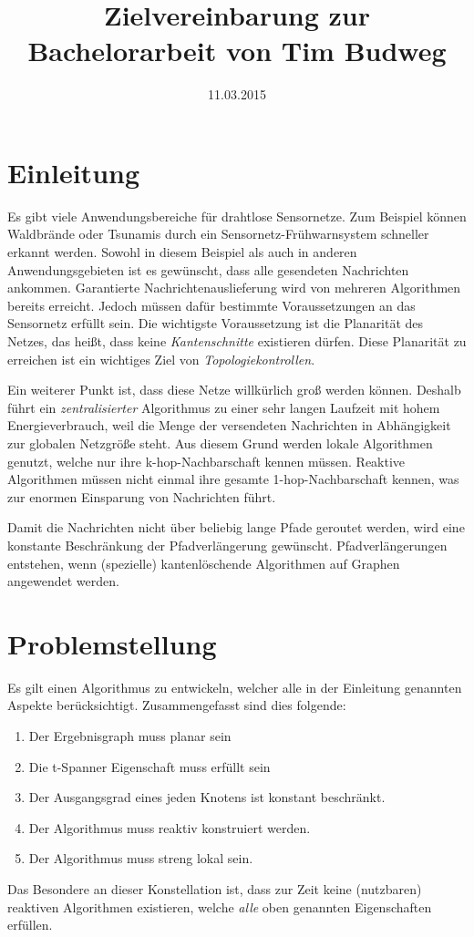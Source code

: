 \documentclass[a4paper,DIV10,10pt,headsepline,smallheadings]{scrreprt}
\title{Zielvereinbarung zur Bachelorarbeit von Tim Budweg}
\author{}
\date{11.03.2015}
\begin{document}
\maketitle

\section{Einleitung}
Es gibt viele Anwendungsbereiche für drahtlose Sensornetze. 
Zum Beispiel können Waldbrände oder Tsunamis durch ein Sensornetz-Frühwarnsystem schneller erkannt werden. 
Sowohl in diesem Beispiel als auch in anderen Anwendungsgebieten ist es gewünscht, dass alle gesendeten Nachrichten ankommen.
Garantierte Nachrichtenauslieferung wird von mehreren Algorithmen bereits erreicht.
Jedoch müssen dafür bestimmte Voraussetzungen an das Sensornetz erfüllt sein. 
Die wichtigste Voraussetzung ist die Planarität des Netzes, das heißt, dass keine \emph{Kantenschnitte} existieren dürfen. 
Diese Planarität zu erreichen ist ein wichtiges Ziel von \emph{Topologiekontrollen}.

Ein weiterer Punkt ist, dass diese Netze willkürlich groß werden können.
Deshalb führt ein \emph{zentralisierter} Algorithmus zu einer sehr langen Laufzeit mit hohem Energieverbrauch, weil die Menge der versendeten Nachrichten in Abhängigkeit zur globalen Netzgröße steht.
Aus diesem Grund werden lokale Algorithmen genutzt, welche nur ihre k-hop-Nachbarschaft kennen müssen.
Reaktive Algorithmen müssen nicht einmal ihre gesamte 1-hop-Nachbarschaft kennen, was zur enormen Einsparung von Nachrichten führt.

Damit die Nachrichten nicht über beliebig lange Pfade geroutet werden, wird eine konstante Beschränkung der Pfadverlängerung gewünscht. 
Pfadverlängerungen entstehen, wenn (spezielle) kantenlöschende Algorithmen auf Graphen angewendet werden.

\section{Problemstellung}
Es gilt einen Algorithmus zu entwickeln, welcher alle in der Einleitung genannten Aspekte berücksichtigt.
Zusammengefasst sind dies folgende:
\begin{enumerate}
\item Der Ergebnisgraph muss planar sein
\item Die t-Spanner Eigenschaft muss erfüllt sein
\item Der Ausgangsgrad eines jeden Knotens ist konstant beschränkt.
\item Der Algorithmus muss reaktiv konstruiert werden.
\item Der Algorithmus muss streng lokal sein.
\end{enumerate}
Das Besondere an dieser Konstellation ist, dass zur Zeit keine (nutzbaren) reaktiven Algorithmen existieren, welche \emph{alle} oben genannten Eigenschaften erfüllen.
\end{document}
